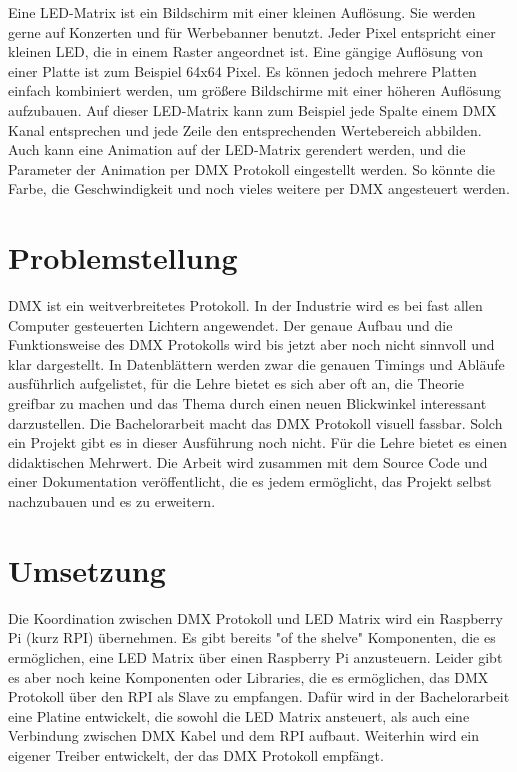 Eine LED-Matrix ist ein Bildschirm mit einer kleinen Auflösung. Sie werden gerne auf Konzerten und für Werbebanner benutzt. Jeder Pixel entspricht einer kleinen LED, die in einem Raster angeordnet ist. Eine gängige Auflösung von einer Platte ist zum Beispiel 64x64 Pixel. Es können jedoch mehrere Platten einfach kombiniert werden, um größere Bildschirme mit einer höheren Auflösung aufzubauen. Auf dieser LED-Matrix kann zum Beispiel jede Spalte einem DMX Kanal entsprechen und jede Zeile den entsprechenden Wertebereich abbilden. Auch kann eine Animation auf der LED-Matrix gerendert werden, und die Parameter der Animation per DMX Protokoll eingestellt werden. So könnte die Farbe, die Geschwindigkeit und noch vieles weitere per DMX angesteuert werden. 

\section{Problemstellung}
DMX ist ein weitverbreitetes Protokoll. In der Industrie wird es bei fast allen Computer gesteuerten Lichtern angewendet. Der genaue Aufbau und die Funktionsweise des DMX Protokolls wird bis jetzt aber noch nicht sinnvoll und klar dargestellt. In Datenblättern werden zwar die genauen Timings und Abläufe ausführlich aufgelistet, für die Lehre bietet es sich aber oft an, die Theorie greifbar zu machen und das Thema durch einen neuen Blickwinkel interessant darzustellen. Die Bachelorarbeit macht das DMX Protokoll visuell fassbar. Solch ein Projekt gibt es in dieser Ausführung noch nicht. Für die Lehre bietet es einen didaktischen Mehrwert. Die Arbeit wird zusammen mit dem Source Code und einer Dokumentation veröffentlicht, die es jedem ermöglicht, das Projekt selbst nachzubauen und es zu erweitern. 

\section{Umsetzung}
Die Koordination zwischen DMX Protokoll und LED Matrix wird ein Raspberry Pi (kurz RPI) übernehmen. Es gibt bereits "of the shelve" Komponenten, die es ermöglichen, eine LED Matrix über einen Raspberry Pi anzusteuern. Leider gibt es aber noch keine Komponenten oder Libraries, die es ermöglichen, das DMX Protokoll über den RPI als Slave zu empfangen. Dafür wird in der Bachelorarbeit eine Platine entwickelt, die sowohl die LED Matrix ansteuert, als auch eine Verbindung zwischen DMX Kabel und dem RPI aufbaut. Weiterhin wird ein eigener Treiber entwickelt, der das DMX Protokoll empfängt.


